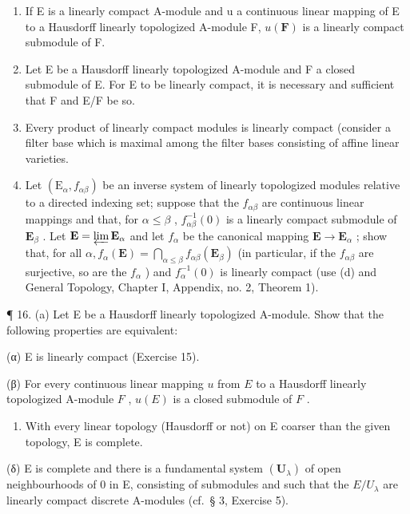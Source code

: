 \begin{enumerate}
\def\labelenumi{(\alph{enumi})}
\setcounter{enumi}{1}
\item
  If E is a linearly compact A-module and u a continuous linear mapping of E to a Hausdorff linearly topologized A-module F, \(u(\mathbf{F})\) is a linearly compact submodule of F.
\item
  Let E be a Hausdorff linearly topologized A-module and F a closed submodule of E. For E to be linearly compact, it is necessary and sufficient that F and E/F be so.
\item
  Every product of linearly compact modules is linearly compact (consider a filter base which is maximal among the filter bases consisting of affine linear varieties.
\item
  Let \((\mathrm{E}_{\alpha}, f_{\alpha \beta})\) be an inverse system of linearly topologized modules relative to a directed indexing set; suppose that the \(f_{\alpha \beta}\) are continuous linear mappings and that, for \(\alpha \leqslant \beta\) , \(f_{\alpha \beta}^{-1}(0)\) is a linearly compact submodule of \(\mathbf{E}_{\beta}\) . Let \(\mathbf{E} = \varprojlim \mathbf{E}_{\alpha}\) and let \(f_{\alpha}\) be the canonical mapping \(\mathbf{E} \to \mathbf{E}_{\alpha}\) ; show that, for all \(\alpha, f_{\alpha}(\mathbf{E}) = \bigcap_{\alpha \leqslant \beta} f_{\alpha \beta}(\mathbf{E}_{\beta})\) (in particular, if the \(f_{\alpha \beta}\) are surjective, so are the \(f_{\alpha}\) ) and \(f_{\alpha}^{-1}(0)\) is linearly compact (use (d) and General Topology, Chapter I, Appendix, no. 2, Theorem 1).
\end{enumerate}

¶ 16. (a) Let E be a Hausdorff linearly topologized A-module. Show that the following properties are equivalent:

(α) E is linearly compact (Exercise 15).

(β) For every continuous linear mapping \(u\) from \(E\) to a Hausdorff linearly topologized A-module \(F\) , \(u(E)\) is a closed submodule of \(F\) .

\begin{enumerate}
\def\labelenumi{(\Alph{enumi})}
\setcounter{enumi}{24}
\tightlist
\item[(γ)]
  With every linear topology (Hausdorff or not) on E coarser than the given topology, E is complete.
\end{enumerate}

(δ) E is complete and there is a fundamental system \((\mathbf{U}_{\lambda})\) of open neighbourhoods of 0 in E, consisting of submodules and such that the \(E/U_{\lambda}\) are linearly compact discrete A-modules (cf.~§ 3, Exercise 5).

